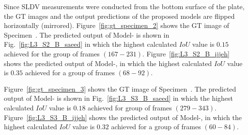 Since SLDV measurements were conducted from the bottom surface of the plate, the GT images and the output predictions of the proposed models are flipped horizontally (mirrored).
Figure~\ref{fig:gt_specimen_2} shows the GT image of Specimen~.
The predicted output of Model- is shown in Fig.~\ref{fig:L3_S2_B_saeed} in which the highest calculated \(IoU\) value is \(0.15\) achieved for the group of frames \((167-231)\).
Figure~\ref{fig:L3_S2_B_ijjeh} shows the predicted output of Model-, in which the highest calculated \(IoU\) value is \(0.35\) achieved for a group of frames \((68-92)\).

Figure~\ref{fig:gt_specimen_3} shows the GT image of Specimen~.
The predicted output of Model- is shown in Fig.~\ref{fig:L3_S3_B_saeed} in which the highest calculated \(IoU\) value is \(0.18\) achieved for group of frames \((279-343)\).
Figure~\ref{fig:L3_S3_B_ijjeh} shows the predicted output of Model-, in which the highest calculated \(IoU\) value is \(0.32\) achieved for a group of frames \((60-84)\).

